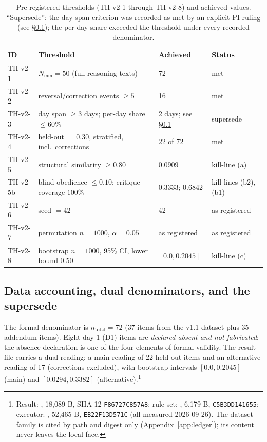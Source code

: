 \documentclass[11pt]{article}
\newcommand{\sha}[1]{\texttt{#1}}
\begin{document}
\begin{table}[htbp]
\centering
\begin{tabular}{llll}
\toprule
ID & Threshold & Achieved & Status \\
\midrule
TH-v2-1 & $N_{\min} = 50$ (full reasoning texts) & 72 & met \\
TH-v2-2 & reversal/correction events $\geq 5$ & 16 & met \\
TH-v2-3 & day span $\geq 3$ days; per-day share $\leq 60\%$ & 2 days; see \S\ref{sec:accounting} & supersede \\
TH-v2-4 & held-out $= 0.30$, stratified, incl.\ corrections & 22 of 72 & met \\
TH-v2-5 & structural similarity $\geq 0.80$ & 0.0909 & kill-line (a) \\
TH-v2-5b & blind-obedience $\leq 0.10$; critique coverage $100\%$ & 0.3333; 0.6842 & kill-lines (b2), (b1) \\
TH-v2-6 & seed $= 42$ & 42 & as registered \\
TH-v2-7 & permutation $n = 1000$, $\alpha = 0.05$ & as registered & as registered \\
TH-v2-8 & bootstrap $n = 1000$, 95\% CI, lower bound 0.50 & $[0.0, 0.2045]$ & kill-line (c) \\
\bottomrule
\end{tabular}
\caption{Pre-registered thresholds (TH-v2-1 through TH-v2-8) and achieved values. ``Supersede'': the day-span criterion was recorded as met by an explicit PI ruling (see \S\ref{sec:accounting}); the per-day share exceeded the threshold under every recorded denominator.}
\label{tab:thresholds}
\end{table}

\subsection{Data accounting, dual denominators, and the supersede}\label{sec:accounting}

The formal denominator is $n_{\mathrm{total}} = 72$ (37 items from the v1.1 dataset plus 35 addendum items). Eight day-1 (D1) items are \emph{declared absent and not fabricated}; the absence declaration is one of the four elements of formal validity. The result file carries a dual reading: a main reading of 22 held-out items and an alternative reading of 17 (corrections excluded), with bootstrap intervals $[0.0, 0.2045]$ (main) and $[0.0294, 0.3382]$ (alternative).\footnote{Result: , 18{,}089 B, SHA-12 \sha{F86727C857A8}; rule set: , 6{,}179 B, \sha{C5B3DD141655}; executor: , 52{,}465 B, \sha{EB22F13D571C} (all measured 2026-09-26). The dataset family is cited by path and digest only (Appendix~\ref{app:ledger}); its content never leaves the local face.}
\end{document}

